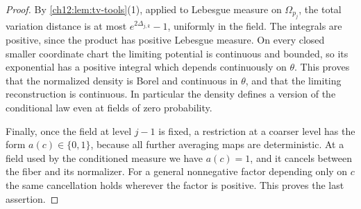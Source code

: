 \begin{proof}
By \cref{ch12:lem:tv-tools}(1), applied to Lebesgue measure on $\Omega_{p_j}$, the total variation distance is at most $e^{2\Delta_{j,k}}-1$, uniformly in the field. The integrals are positive, since the product has positive Lebesgue measure. On every closed smaller coordinate chart the limiting potential is continuous and bounded, so its exponential has a positive integral which depends continuously on $\theta$. This proves that the normalized density is Borel and continuous in $\theta$, and that the limiting reconstruction is continuous. In particular the density defines a version of the conditional law even at fields of zero probability.

Finally, once the field at level $j-1$ is fixed, a restriction at a coarser level has the form $a(c)\in\{0,1\}$, because all further averaging maps are deterministic. At a field used by the conditioned measure we have $a(c)=1$, and it cancels between the fiber and its normalizer. For a general nonnegative factor depending only on $c$ the same cancellation holds wherever the factor is positive. This proves the last assertion.
\end{proof}

